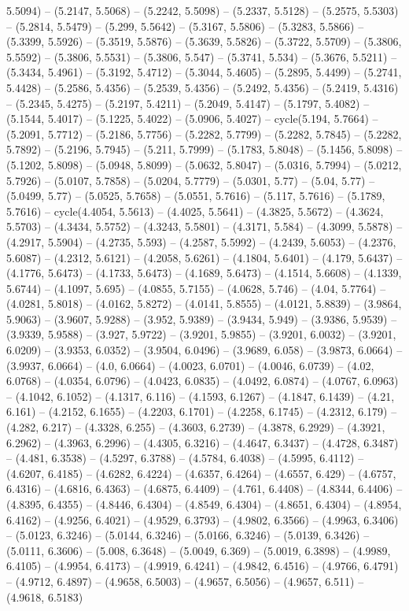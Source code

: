 5.5094) -- (5.2147, 5.5068) -- (5.2242, 5.5098) -- (5.2337, 5.5128) -- (5.2575, 5.5303) -- (5.2814, 5.5479) -- (5.299, 5.5642) -- (5.3167, 5.5806) -- (5.3283, 5.5866) -- (5.3399, 5.5926) -- (5.3519, 5.5876) -- (5.3639, 5.5826) -- (5.3722, 5.5709) -- (5.3806, 5.5592) -- (5.3806, 5.5531) -- (5.3806, 5.547) -- (5.3741, 5.534) -- (5.3676, 5.5211) -- (5.3434, 5.4961) -- (5.3192, 5.4712) -- (5.3044, 5.4605) -- (5.2895, 5.4499) -- (5.2741, 5.4428) -- (5.2586, 5.4356) -- (5.2539, 5.4356) -- (5.2492, 5.4356) -- (5.2419, 5.4316) -- (5.2345, 5.4275) -- (5.2197, 5.4211) -- (5.2049, 5.4147) -- (5.1797, 5.4082) -- (5.1544, 5.4017) -- (5.1225, 5.4022) -- (5.0906, 5.4027) -- cycle(5.194, 5.7664) -- (5.2091, 5.7712) -- (5.2186, 5.7756) -- (5.2282, 5.7799) -- (5.2282, 5.7845) -- (5.2282, 5.7892) -- (5.2196, 5.7945) -- (5.211, 5.7999) -- (5.1783, 5.8048) -- (5.1456, 5.8098) -- (5.1202, 5.8098) -- (5.0948, 5.8099) -- (5.0632, 5.8047) -- (5.0316, 5.7994) -- (5.0212, 5.7926) -- (5.0107, 5.7858) -- (5.0204, 5.7779) -- (5.0301, 5.77) -- (5.04, 5.77) -- (5.0499, 5.77) -- (5.0525, 5.7658) -- (5.0551, 5.7616) -- (5.117, 5.7616) -- (5.1789, 5.7616) -- cycle(4.4054, 5.5613) -- (4.4025, 5.5641) -- (4.3825, 5.5672) -- (4.3624, 5.5703) -- (4.3434, 5.5752) -- (4.3243, 5.5801) -- (4.3171, 5.584) -- (4.3099, 5.5878) -- (4.2917, 5.5904) -- (4.2735, 5.593) -- (4.2587, 5.5992) -- (4.2439, 5.6053) -- (4.2376, 5.6087) -- (4.2312, 5.6121) -- (4.2058, 5.6261) -- (4.1804, 5.6401) -- (4.179, 5.6437) -- (4.1776, 5.6473) -- (4.1733, 5.6473) -- (4.1689, 5.6473) -- (4.1514, 5.6608) -- (4.1339, 5.6744) -- (4.1097, 5.695) -- (4.0855, 5.7155) -- (4.0628, 5.746) -- (4.04, 5.7764) -- (4.0281, 5.8018) -- (4.0162, 5.8272) -- (4.0141, 5.8555) -- (4.0121, 5.8839) -- (3.9864, 5.9063) -- (3.9607, 5.9288) -- (3.952, 5.9389) -- (3.9434, 5.949) -- (3.9386, 5.9539) -- (3.9339, 5.9588) -- (3.927, 5.9722) -- (3.9201, 5.9855) -- (3.9201, 6.0032) -- (3.9201, 6.0209) -- (3.9353, 6.0352) -- (3.9504, 6.0496) -- (3.9689, 6.058) -- (3.9873, 6.0664) -- (3.9937, 6.0664) -- (4.0, 6.0664) -- (4.0023, 6.0701) -- (4.0046, 6.0739) -- (4.02, 6.0768) -- (4.0354, 6.0796) -- (4.0423, 6.0835) -- (4.0492, 6.0874) -- (4.0767, 6.0963) -- (4.1042, 6.1052) -- (4.1317, 6.116) -- (4.1593, 6.1267) -- (4.1847, 6.1439) -- (4.21, 6.161) -- (4.2152, 6.1655) -- (4.2203, 6.1701) -- (4.2258, 6.1745) -- (4.2312, 6.179) -- (4.282, 6.217) -- (4.3328, 6.255) -- (4.3603, 6.2739) -- (4.3878, 6.2929) -- (4.3921, 6.2962) -- (4.3963, 6.2996) -- (4.4305, 6.3216) -- (4.4647, 6.3437) -- (4.4728, 6.3487) -- (4.481, 6.3538) -- (4.5297, 6.3788) -- (4.5784, 6.4038) -- (4.5995, 6.4112) -- (4.6207, 6.4185) -- (4.6282, 6.4224) -- (4.6357, 6.4264) -- (4.6557, 6.429) -- (4.6757, 6.4316) -- (4.6816, 6.4363) -- (4.6875, 6.4409) -- (4.761, 6.4408) -- (4.8344, 6.4406) -- (4.8395, 6.4355) -- (4.8446, 6.4304) -- (4.8549, 6.4304) -- (4.8651, 6.4304) -- (4.8954, 6.4162) -- (4.9256, 6.4021) -- (4.9529, 6.3793) -- (4.9802, 6.3566) -- (4.9963, 6.3406) -- (5.0123, 6.3246) -- (5.0144, 6.3246) -- (5.0166, 6.3246) -- (5.0139, 6.3426) -- (5.0111, 6.3606) -- (5.008, 6.3648) -- (5.0049, 6.369) -- (5.0019, 6.3898) -- (4.9989, 6.4105) -- (4.9954, 6.4173) -- (4.9919, 6.4241) -- (4.9842, 6.4516) -- (4.9766, 6.4791) -- (4.9712, 6.4897) -- (4.9658, 6.5003) -- (4.9657, 6.5056) -- (4.9657, 6.511) -- (4.9618, 6.5183) 